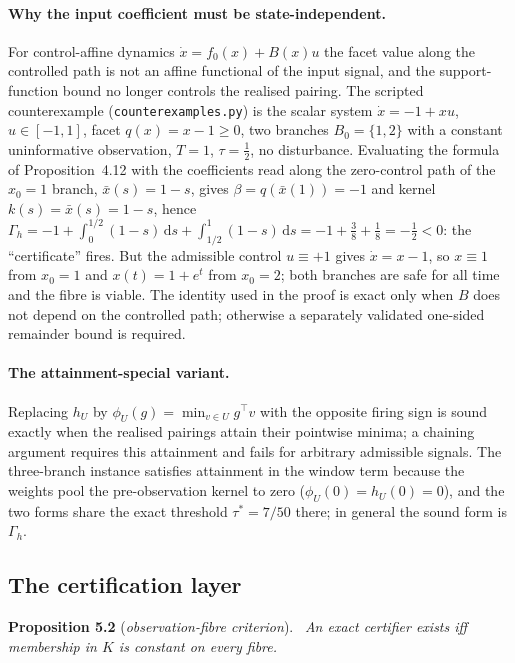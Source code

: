 \documentclass[11pt,a4paper]{article}
\theoremstyle{plain}
\theoremstyle{definition}
\theoremstyle{remark}
\newenvironment{restated}[2]{\par\medskip\noindent\textbf{#1} (\textit{#2}).\ \itshape}{\par\medskip}
\newcommand{\dd}{\,\mathrm{d}}
\begin{document}
\paragraph{Why the input coefficient must be state-independent.} For control-affine dynamics $\dot x=f_0(x)+B(x)u$ the facet value along the controlled path is not an affine functional of the input signal, and the support-function bound no longer controls the realised pairing. The scripted counterexample (\texttt{counterexamples.py}) is the scalar system $\dot x=-1+xu$, $u\in[-1,1]$, facet $q(x)=x-1\ge0$, two branches $B_0=\{1,2\}$ with a constant uninformative observation, $T=1$, $\tau=\tfrac12$, no disturbance. Evaluating the formula of Proposition~4.12 with the coefficients read along the zero-control path of the $x_0=1$ branch, $\bar x(s)=1-s$, gives $\beta=q(\bar x(1))=-1$ and kernel $k(s)=\bar x(s)=1-s$, hence $\Gamma_h=-1+\int_0^{1/2}(1-s)\dd s+\int_{1/2}^1(1-s)\dd s=-1+\tfrac38+\tfrac18=-\tfrac12<0$: the ``certificate'' fires. But the admissible control $u\equiv+1$ gives $\dot x=x-1$, so $x\equiv1$ from $x_0=1$ and $x(t)=1+e^{t}$ from $x_0=2$; both branches are safe for all time and the fibre is viable. The identity used in the proof is exact only when $B$ does not depend on the controlled path; otherwise a separately validated one-sided remainder bound is required.

\paragraph{The attainment-special variant.} Replacing $h_U$ by $\phi_U(g)=\min_{v\in U}g^\top v$ with the opposite firing sign is sound exactly when the realised pairings attain their pointwise minima; a chaining argument requires this attainment and fails for arbitrary admissible signals. The three-branch instance satisfies attainment in the window term because the weights pool the pre-observation kernel to zero ($\phi_U(0)=h_U(0)=0$), and the two forms share the exact threshold $\tau^*=7/50$ there; in general the sound form is $\Gamma_h$.

\subsection{The certification layer}\label{S:cert}

\begin{restated}{Proposition 5.2}{observation-fibre criterion}
An exact certifier exists iff membership in $K$ is constant on every fibre.
\end{restated}
\end{document}
